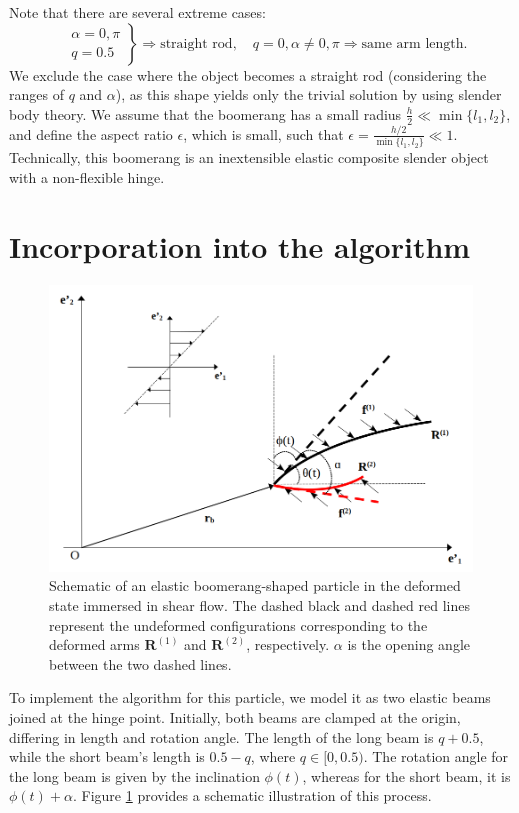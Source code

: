 \documentclass[12pt,MSc,twoside]{muthesis_2020}
\begin{document}
Note that there are several extreme cases:
\begin{equation}
	\label{eqn:1}
	\left.
	\begin{aligned}
		&\alpha=0,\pi \\
		&	q=0.5
	\end{aligned}
	\right\}\Longrightarrow \text{straight rod},\quad 
	q=0, \alpha \neq 0, \pi \Longrightarrow \text{same arm length}.
\end{equation}
We exclude the case where the object becomes a straight rod (considering the ranges of $q$ and $\alpha$), as this shape yields only the trivial solution by using slender body theory. We assume that the boomerang has a small radius $\frac{h}{2}\ll \min\{l_1, l_2\}$, and define the aspect ratio $\epsilon$, which is small, such that $\epsilon=\frac{h/2}{\min\{l_1, l_2\}}\ll1$. Technically, this boomerang is an inextensible elastic composite slender object with a non-flexible hinge. 

\section{Incorporation into the algorithm}
\begin{figure}[!h]
	\begin{center}
		\includegraphics[width=1\textwidth]{plot/fluid.png}
		\caption{Schematic of an elastic boomerang-shaped particle in the deformed state immersed in shear flow. The dashed black and dashed red lines represent the undeformed configurations corresponding to the deformed arms $\mathbf{R}^{(1)}$ and $\mathbf{R}^{(2)}$, respectively. $\alpha$ is the opening angle between the two dashed lines.} 
    \label{fig:6}
	\end{center}
\end{figure}
To implement the algorithm for this particle, we model it as two elastic beams joined at the hinge point. Initially, both beams are clamped at the origin, differing in length and rotation angle. The length of the long beam is $q+0.5$, while the short beam's length is $0.5-q$, where $q \in [0,0.5)$. The rotation angle for the long beam is given by the inclination $\phi(t)$, whereas for the short beam, it is $\phi(t)+\alpha$. Figure \ref{fig:6} provides a schematic illustration of this process. 
\end{document}
